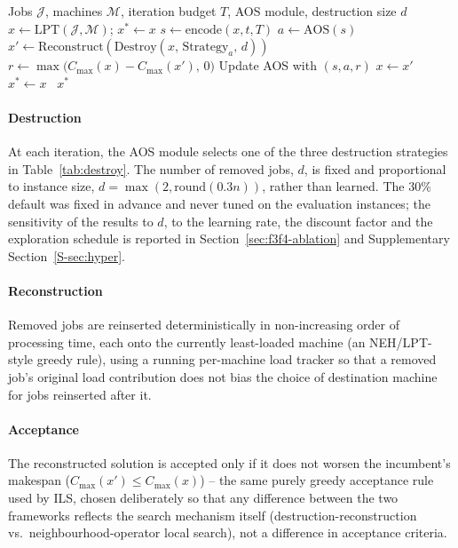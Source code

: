 \documentclass[final,3p,times,11pt,authoryear]{elsarticle}
\begin{document}
\begin{algorithm}[tb]
\caption{IG with AOS for PMSP}
\label{alg:ig}
\begin{algorithmic}[1]
\REQUIRE Jobs $\mathcal{J}$, machines $\mathcal{M}$, iteration budget $T$, AOS module, destruction size $d$
\STATE $x \leftarrow \mathrm{LPT}(\mathcal{J},\mathcal{M})$; $x^{*} \leftarrow x$
\STATE $s \leftarrow \mathrm{encode}(x, t, T)$
\STATE $a \leftarrow \mathrm{AOS}(s)$
\STATE $x' \leftarrow \mathrm{Reconstruct}(\mathrm{Destroy}(x,\, \mathrm{Strategy}_a,\, d))$
\STATE $r \leftarrow \max\bigl(C_{\max}(x) - C_{\max}(x'),\, 0\bigr)$
\STATE Update AOS with $(s, a, r)$
\STATE $x \leftarrow x'$
\ENDIF
{}
\STATE $x^{*} \leftarrow x$
\ENDIF
\ENDFOR
\RETURN~$x^{*}$
\end{algorithmic}
\end{algorithm}

\paragraph{Destruction}
At each iteration, the AOS module selects one of the three destruction
strategies in Table~\ref{tab:destroy}.
The number of removed jobs, $d$, is fixed and proportional to instance
size, $d = \max(2, \mathrm{round}(0.3n))$, rather than learned. The
$30\%$ default was fixed in advance and never tuned on the evaluation
instances; the sensitivity of the results to $d$, to the learning rate,
the discount factor and the exploration schedule is reported in
Section~\ref{sec:f3f4-ablation} and Supplementary
Section~\ref{S-sec:hyper}.

\paragraph{Reconstruction}
Removed jobs are reinserted deterministically in non-increasing order
of processing time, each onto the currently least-loaded machine (an
NEH/LPT-style greedy rule), using a running per-machine load tracker so
that a removed job's original load contribution does not bias the
choice of destination machine for jobs reinserted after it.

\paragraph{Acceptance}
The reconstructed solution is accepted only if it does not worsen the
incumbent's makespan ($C_{\max}(x') \leq C_{\max}(x)$) -- the same
purely greedy acceptance rule used by ILS, chosen deliberately so that
any difference between the two frameworks reflects the search
mechanism itself (destruction-reconstruction vs.\ neighbourhood-operator
local search), not a difference in acceptance criteria.
\end{document}
